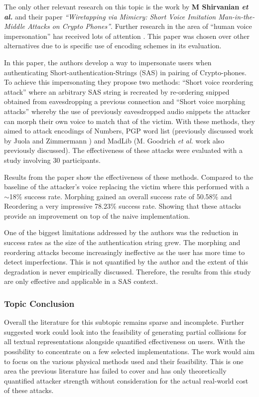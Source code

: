 The only other relevant research on this topic is the work by \textbf{M Shirvanian \textit{et al.}}\cite{shirvanian2014wiretapping} 
and their paper \textit{``Wiretapping via Mimicry: Short 
Voice Imitation Man-in-the-Middle Attacks on Crypto 
Phones''}. Further research in the area of ``human voice impersonation'' has received lots of attention \cite{mukhopadhyay2015all}\cite{chen2017you}\cite{wu2015spoofing}. This paper was chosen over other alternatives due to is specific use of encoding schemes in its evaluation.

In this paper, the authors develop a way to 
impersonate users when authenticating 
Short-authentication-Strings (SAS) in pairing of 
Crypto-phones. To achieve this impersonating they propose 
two methods: ``Short voice reordering attack'' where an 
arbitrary SAS string is recreated by re-ordering snipped 
obtained from eavesdropping a previous connection
and ``Short voice morphing attacks'' whereby the use of 
previously eavesdropped audio snippets the attacker can
morph their own voice to match that of the victim. With 
these methods, they aimed to attack encodings of Numbers, 
PGP word list (previously discussed work by Juola and 
Zimmermann \cite{juola1996whole}) and MadLib (M. Goodrich 
\textit{et al.}\cite{goodrich2006loud} work also 
previously discussed). The effectiveness of these attacks 
were evaluated with a study involving 30 participants.

Results from the paper show the effectiveness of these 
methods. Compared to the baseline of the attacker's voice 
replacing the victim where this performed with a 
$\sim$18\% success rate. Morphing gained an 
overall success rate of 50.58\% and Reordering a very 
impressive 78.23\% success rate. Showing that these 
attacks provide an improvement on top of the naive implementation.

One of the biggest limitations addressed by the authors 
was the reduction in success rates as the size of the 
authentication string grew. The morphing and reordering 
attacks become increasingly ineffective as the user has 
more time to detect imperfections. This is not quantified by 
the author and the extent of this degradation is never 
empirically discussed. Therefore, the results from this 
study are only effective and applicable in a SAS context.



\subsubsection{Topic Conclusion}
Overall the literature for this subtopic remains sparse and incomplete. Further suggested work could look into the feasibility of generating partial collisions for all textual representations alongside quantified effectiveness on users. With the possibility to concentrate on a few selected implementations. The work would aim to focus on the various physical methods used and their feasibility. This is one area the previous literature has failed to cover and has only theoretically quantified attacker strength without consideration for the actual real-world cost of these attacks.

